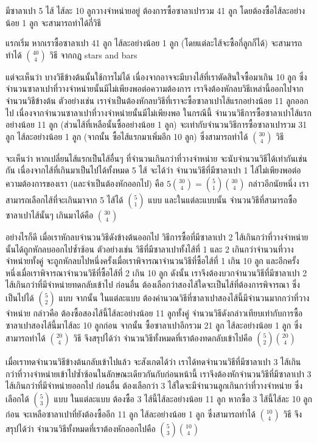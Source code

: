 \begin{example}
มีซาลาเปา 5 ไส้ ไส้ละ 10 ลูกวางจำหน่ายอยู่ \enskip ต้องการซื้อซาลาเปารวม 41 ลูก โดยต้องซื้อไส้ละอย่างน้อย 1 ลูก จะสามารถทำได้กี่วิธี

แรกเริ่ม หากเราซื้อซาลาเปา 41 ลูก ไส้ละอย่างน้อย 1 ลูก (โดยแต่ละไส้จะซื้อกี่ลูกก็ได้) จะสามารถทำได้ $\binom{40}{4}$ วิธี จากกฎ stars and bars

แต่จะเห็นว่า บางวิธีข้างต้นนั้นใช้การไม่ได้ เนื่องจากอาจจะมีบางไส้ที่เราตัดสินใจซื้อมาเกิน 10 ลูก ซึ่งจำนวนซาลาเปาที่วางจำหน่ายนั้นมีไม่เพียงพอต่อความต้องการ \enskip เราจึงต้องหักลบวิธีเหล่านี้ออกไปจากจำนวนวิธีข้างต้น \enskip ตัวอย่างเช่น เราจำเป็นต้องหักลบวิธีที่เราจะซื้อซาลาเปาไส้แรกอย่างน้อย 11 ลูกออกไป เนื่องจากจำนวนซาลาเปาที่วางจำหน่ายนั้นมีไม่เพียงพอ ในกรณีนี้ จำนวนวิธีการซื้อซาลาเปาไส้แรกอย่างน้อย 11 ลูก (ส่วนไส้ที่เหลือนั้นซื้ออย่างน้อย 1 ลูก) จะเท่ากับจำนวนวิธีการซื้อซาลาเปารวม 31 ลูก ไส้ละอย่างน้อย 1 ลูก (จากนั้น ซื้อไส้แรกมาเพิ่มอีก 10 ลูก) ซึ่งสามารถทำได้ $\binom{30}{4}$ วิธี

จะเห็นว่า หากเปลี่ยนไส้แรกเป็นไส้อื่นๆ ที่จำนวนเกินกว่าที่วางจำหน่าย จะนับจำนวนวิธีได้เท่ากันเช่นกัน \enskip เนื่องจากไส้ที่เกินมาเป็นไปได้ทั้งหมด 5 ไส้ จะได้ว่า จำนวนวิธีที่มีซาลาเปา 1 ไส้ไม่เพียงพอต่อความต้องการของเรา (และจำเป็นต้องหักออกไป) คือ $5\binom{30}{4}=\binom{5}{1}\binom{30}{4}$ \enskip กล่าวอีกนัยหนึ่ง เราสามารถเลือกไส้ที่จะเกินมาจาก 5 ไส้ได้ $\binom{5}{1}$ แบบ และในแต่ละแบบนั้น จำนวนวิธีที่สามารถซื้อซาลาเปาไส้นั้นๆ เกินมาได้คือ $\binom{30}{4}$

อย่างไรก็ดี เมื่อเราหักลบจำนวนวิธีดังข้างต้นออกไป วิธีการซื้อที่มีซาลาเปา 2 ไส้เกินกว่าที่วางจำหน่ายนั้นได้ถูกหักลบออกไปซ้ำซ้อน \enskip ตัวอย่างเช่น วิธีที่มีซาลาเปาทั้งไส้ที่ 1 และ 2 เกินกว่าจำนวนที่วางจำหน่ายทั้งคู่ จะถูกหักลบไปหนึ่งครั้งเมื่อเราพิจารณาจำนวนวิธีที่ซื้อไส้ที่ 1 เกิน 10 ลูก และอีกครั้งหนึ่งเมื่อเราพิจารณาจำนวนวิธีที่ซื้อไส้ที่ 2 เกิน 10 ลูก \enskip ดังนั้น เราจึงต้องบวกจำนวนวิธีที่มีซาลาเปา 2 ไส้เกินกว่าที่มีจำหน่ายทดกลับเข้าไป \enskip ก่อนอื่น ต้องเลือกว่าสองไส้ใดจะเป็นไส้ที่ต้องการพิจารณา ซึ่งเป็นไปได้ $\binom{5}{2}$ แบบ \enskip จากนั้น ในแต่ละแบบ ต้องคำนวณวิธีที่ซาลาเปาสองไส้นี้มีจำนวนมากกว่าที่วางจำหน่าย กล่าวคือ ต้องซื้อสองไส้นี้ไส้ละอย่างน้อย 11 ลูกทั้งคู่ \enskip จำนวนวิธีดังกล่าวเทียบเท่ากับการซื้อซาลาเปาสองไส้นี้มาไส้ละ 10 ลูกก่อน จากนั้น ซื้อซาลาเปาอีกรวม 21 ลูก ไส้ละอย่างน้อย 1 ลูก ซึ่งสามารถทำได้ $\binom{20}{4}$ วิธี \enskip จึงสรุปได้ว่า จำนวนวิธีทั้งหมดที่เราต้องทดกลับเข้าไปคือ $\binom{5}{2}\binom{20}{4}$

เมื่อเราทดจำนวนวิธีข้างต้นกลับเข้าไปแล้ว จะสังเกตได้ว่า เราได้ทดจำนวนวิธีที่มีซาลาเปา 3 ไส้เกินกว่าที่วางจำหน่ายเข้าไปซ้ำซ้อนในลักษณะเดียวกันกับก่อนหน้านี้ \enskip เราจึงต้องหักจำนวนวิธีที่มีซาลาเปา 3 ไส้เกินกว่าที่มีจำหน่ายออกไป \enskip ก่อนอื่น ต้องเลือกว่า 3 ไส้ใดจะมีจำนวนลูกเกินกว่าที่วางจำหน่าย ซึ่งเลือกได้ $\binom{5}{3}$ แบบ ในแต่ละแบบ ต้องซื้อ 3 ไส้นี้ไส้ละอย่างน้อย 11 ลูก \enskip หากซื้อ 3 ไส้นี้ไส้ละ 10 ลูกก่อน จะเหลือซาลาเปาที่ยังต้องซื้ออีก 11 ลูก ไส้ละอย่างน้อย 1 ลูก ซึ่งสามารถทำได้ $\binom{10}{4}$ วิธี \enskip จึงสรุปได้ว่า จำนวนวิธีทั้งหมดที่เราต้องหักออกไปคือ $\binom{5}{3}\binom{10}{4}$


\end{example}

